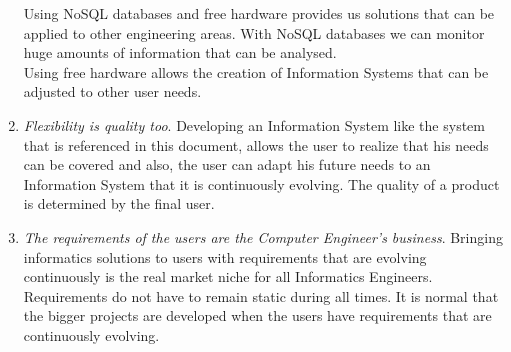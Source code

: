 \begin{enumerate}
Using NoSQL databases and free hardware provides us solutions that can be applied to other engineering areas. With NoSQL databases we can monitor huge amounts of information that can be analysed.\\

Using free hardware allows the creation of Information Systems that can be adjusted to other user needs.

\item \textit{Flexibility is quality too}. Developing an Information System like the system that is referenced in this document, allows the user to realize that his needs can be covered and also, the user can adapt his future needs to an Information System that it is continuously evolving. The quality of a product is determined by the final user.

\item \textit{The requirements of the users are the Computer Engineer's business}. Bringing informatics solutions to users with requirements that are evolving continuously is the real market niche for all Informatics Engineers. Requirements do not have to remain static during all times. It is normal that the bigger projects are developed when the users have requirements that are continuously evolving.

\end{enumerate}




